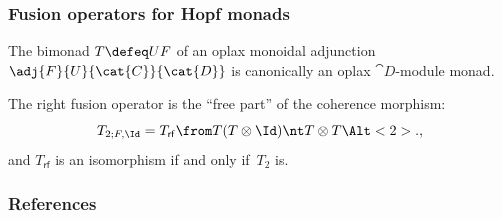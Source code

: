 \documentclass[aspectratio=169,12pt,professionalfont]{beamer}
\begin{document}
\begin{frame}\frametitle{Fusion operators for Hopf monads}
  \begin{proposition*}[Stroiński--Z]
    The bimonad \(T \defeq UF\) of an oplax monoidal adjunction \(\adj{F}{U}{\cat{C}}{\cat{D}}\)
    is canonically an oplax \(\cat{D}\)\hyp{}module monad.

    \pause%
    The right fusion operator is the ``free part'' of the coherence morphism:
    \[
      T_{2;F,\Id} = T_{\mathsf{rf}} \from T(T \otimes \Id) \nt T \otimes T \Alt<2>{.}{,}
    \]
    \pause%
    and \(T_{\mathsf{rf}}\) is an isomorphism if and only if \(\,T_2\) is.
  \end{proposition*}
\end{frame}

\begin{frame}[allowframebreaks]\frametitle{References}
  \nocite{Bruguieres2011}
  \nocite{Etingof2015}
  \nocite{Moerdijk2002}
  \nocite{aguiar18:monad}
  \nocite{day77:note}
  \nocite{deligne02:categ}
  \nocite{douglas19}
  \nocite{halbig23:diagr-comod-monad}
  \nocite{hausser99:integ-theor-quasi-hopf-algeb}
  \nocite{kelly74:doctr}
  \nocite{linton69:coequal}
  \nocite{ostrik03:modul-hopf}
  \nocite{ostrik04:tensor-p}
  \nocite{saracco17:hopf}
  \nocite{stroinski2024:reconstr}
  \def\bibfont{\tiny}
  \printbibliography[heading=none]%
\end{frame}
\end{document}

